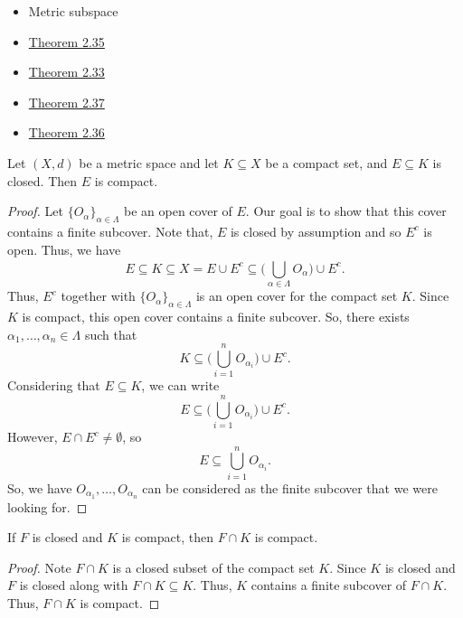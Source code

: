 \documentclass[a4paper]{report}
\begin{document}
\begin{itemize}
    \item Metric subspace
    \item {\hyperref[Theorem 2.35]{Theorem 2.35}} 
    \item {\hyperref[Theorem 2.33]{Theorem 2.33}} 
    \item {\hyperref[Theorem 2.37]{Theorem 2.37}} 
    \item {\hyperref[Theorem 2.36]{Theorem 2.36}} 
\end{itemize}

\begin{theorem}[ ]\label{Theorem 2.35}
    Let \( (X,d) \) be a metric space and let \( K \subseteq  X  \) be a compact set, and \( E \subseteq  K  \) is closed. Then \( E  \) is compact.
\end{theorem}
\begin{proof}
    Let \( \{ {O}_{\alpha} \}_{\alpha \in \Lambda} \) be an open cover of \( E  \). Our goal is to show that this cover contains a finite subcover. Note that, \( E  \) is closed by assumption and so \( E^{c} \) is open. Thus, we have \[ E \subseteq  K  \subseteq  X  = E  \cup E^{c} \subseteq  \Big(  \bigcup_{ \alpha \in \Lambda }^{  }  {O}_{\alpha} \Big) \cup E^{c}.  \]
    Thus, \( E^{c}  \) together with \( \{ {O}_{\alpha} \}_{\alpha \in \Lambda} \) is an open cover for the compact set \( K  \). Since \(  K  \) is compact, this open cover contains a finite subcover. So, there exists \( {\alpha}_{1}, \dots, {\alpha}_{n} \in \Lambda \) such that 
    \[  K \subseteq  \Big( \bigcup_{ i = 1  }^{ n }  {O}_{{\alpha}_{i}} \Big) \cup E^{c}. \]
    Considering that \( E \subseteq K \), we can write 
    \[  E \subseteq  \Big( \bigcup_{ i = 1  }^{ n }  {O}_{{\alpha}_{i}} \Big) \cup E^{c}. \]
    However, \(E \cap E^{c} \neq \emptyset \), so
    \[  E \subseteq \bigcup_{ i = 1  }^{ n   }  {O}_{{\alpha}_{i}}. \]
    So, we have \( {O}_{{\alpha}_{1}}, \dots, {O}_{{\alpha}_{n}} \) can be considered as the finite subcover that we were looking for.
\end{proof}

\begin{corollary}
    If \( F  \) is closed and \( K  \) is compact, then \( F \cap K  \) is compact.
\end{corollary}
\begin{proof}
Note \( F \cap K  \) is a closed subset of the compact set \(  K  \). Since \( K   \) is closed and \( F  \) is closed along with \( F \cap K \subseteq  K   \). Thus, \( K  \) contains a finite subcover of \( F \cap K  \). Thus, \( F \cap K  \) is compact.
\end{proof}
\end{document}
